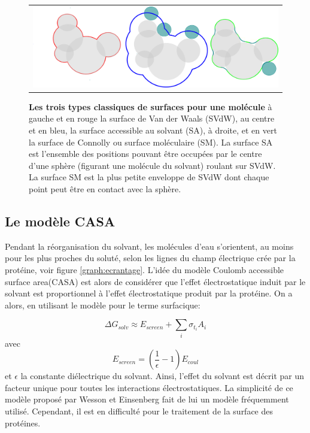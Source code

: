    \begin{figure}[!htbp]
     \centering
     \begin{tabular}{c}
       \includegraphics[width=13cm]{figure/surface.png} &
     \end{tabular}
     
     \caption{\textbf{Les trois types classiques de surfaces pour une molécule} à gauche et en rouge la surface de Van der Waals (SVdW), au centre et en bleu, la surface accessible au solvant (SA), à droite, et en vert  la surface de Connolly ou surface moléculaire (SM). La surface SA est l'ensemble des positions pouvant être occupées par le centre d'une sphère (figurant une molécule du solvant) roulant sur SVdW. La surface SM est la plus petite enveloppe de SVdW dont chaque point peut être en contact avec la sphère. } 
\label{graph:surface}
   \end{figure}
   

\subsection{Le modèle CASA}
\label{sub:CASA}
Pendant la réorganisation du solvant, les molécules d'eau s'orientent, au moins pour les plus proches du soluté, selon les lignes du champ électrique crée par la protéine, voir figure \ref{graph:ecrantage}. L'idée du modèle \og Coulomb accessible surface area\fg (CASA) est alors de considérer que l'effet électrostatique induit par le solvant est proportionnel à l'effet électrostatique produit par la protéine. On a  alors, en utilisant le modèle  pour le terme surfacique:

\begin{equation}
\Delta G_{solv} \approx E_{screen} + \sum_i \sigma_{t_i} A_i
\end{equation}
avec 
\begin{equation}
E_{screen} =  (\frac{1}{\epsilon} -1 )E_{coul}
\end{equation}
et $ \epsilon $ la constante diélectrique du solvant. Ainsi, l'effet du solvant est décrit par un facteur unique pour toutes les interactions électrostatiques. La simplicité de ce modèle proposé par Wesson et Einsenberg \cite{Wesson92} fait de lui un modèle fréquemment utilisé. Cependant, il est en difficulté pour le traitement de la surface des protéines.


